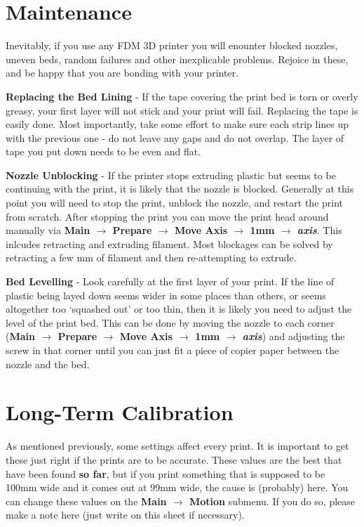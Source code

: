 \documentclass[a4paper,12pt]{article}
\begin{document}
\newpage
\thispagestyle{empty}
\footnotesize{

\section*{Maintenance}
Inevitably, if you use any FDM 3D printer you will enounter blocked nozzles, uneven beds, random failures and other inexplicable problems.
Rejoice in these, and be happy that you are bonding with your printer.

\vspace*{2mm}
\noindent \textbf{Replacing the Bed Lining} - If the tape covering the print bed is torn or overly greasy, your first layer will not stick and your print will fail. Replacing the tape is 
easily done. Most importantly, take some effort to make sure each strip lines up with the previous one - do not leave any gaps and do not overlap.
The layer of tape you put down needs to be even and flat.


\vspace*{2mm}
\noindent \textbf{Nozzle Unblocking} - If the printer stops extruding plastic but seems to be continuing with the print, it is likely that the nozzle is blocked. Generally at this point you will need to
stop the print, unblock the nozzle, and restart the print from scratch. After stopping the print you can move the print head around
manually via \textbf{Main $\rightarrow$ Prepare $\rightarrow$ Move Axis $\rightarrow$ 1mm $\rightarrow$ \textit{axis}}. This inlcudes retracting and extruding filament. Most blockages
can be solved by retracting a few mm of filament and then re-attempting to extrude. 

\vspace*{2mm}
\noindent \textbf{Bed Levelling} - Look carefully at the first layer of your print. If the line of plastic being layed down seems wider in some places than others, or seems altogether too `squashed out' or too thin,
then it is likely you need to adjust the level of the print bed. This can be done by moving the nozzle to each corner (\textbf{Main $\rightarrow$ Prepare $\rightarrow$ Move Axis $\rightarrow$ 1mm $\rightarrow$ \textit{axis}})
and adjusting the screw in that corner until you can just fit a piece of copier paper between the nozzle and the bed.



\section*{Long-Term Calibration}
As mentioned previously, some settings affect every print. It is important to get these just right if the prints are to be 
accurate. These values are the best that have been found \textbf{so far}, but if you print something that is supposed to be 100mm wide and 
it comes out at 99mm wide, the cause is (probably) here. You can change these values on the \textbf{Main $\rightarrow$ Motion} submenu. If you do so, please
make a note here (just write on this sheet if necessary).

}
\end{document}
